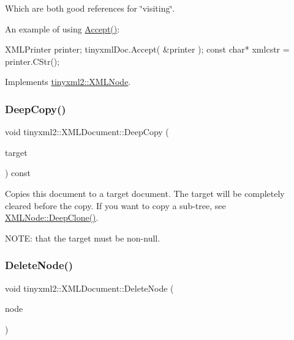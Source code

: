 Which are both good references for \char`\"{}visiting\char`\"{}.

An example of using \mbox{\hyperlink{classtinyxml2_1_1_x_m_l_document_ab7be651917a35ab1ff0e4e6d4e565cdf}{Accept()}}\+: \begin{DoxyVerb}XMLPrinter printer;
tinyxmlDoc.Accept( &printer );
const char* xmlcstr = printer.CStr();
\end{DoxyVerb}
 

Implements \mbox{\hyperlink{classtinyxml2_1_1_x_m_l_node_a81e66df0a44c67a7af17f3b77a152785}{tinyxml2\+::\+X\+M\+L\+Node}}.

\mbox{\label{classtinyxml2_1_1_x_m_l_document_af592ffc91514e25a39664521ac83db45}} 
\subsubsection{\texorpdfstring{DeepCopy()}{DeepCopy()}}
{\footnotesize\ttfamily void tinyxml2\+::\+X\+M\+L\+Document\+::\+Deep\+Copy (\begin{DoxyParamCaption}\item[{\mbox{\hyperlink{classtinyxml2_1_1_x_m_l_document}{X\+M\+L\+Document}} $\ast$}]{target }\end{DoxyParamCaption}) const}

Copies this document to a target document. The target will be completely cleared before the copy. If you want to copy a sub-\/tree, see \mbox{\hyperlink{classtinyxml2_1_1_x_m_l_node_a3bb369fd733f1989b751d99a9417adab}{X\+M\+L\+Node\+::\+Deep\+Clone()}}.

N\+O\+TE\+: that the \textquotesingle{}target\textquotesingle{} must be non-\/null. \mbox{\label{classtinyxml2_1_1_x_m_l_document_ac1d6e2c7fcc1a660624ac4f68e96380d}} 
\subsubsection{\texorpdfstring{DeleteNode()}{DeleteNode()}}
{\footnotesize\ttfamily void tinyxml2\+::\+X\+M\+L\+Document\+::\+Delete\+Node (\begin{DoxyParamCaption}\item[{\mbox{\hyperlink{classtinyxml2_1_1_x_m_l_node}{X\+M\+L\+Node}} $\ast$}]{node }\end{DoxyParamCaption})}

